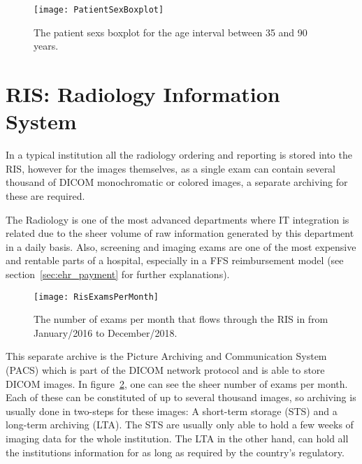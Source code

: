 \begin{center}
\begin{figure}
\begin{centering}
\texttt{[image: PatientSexBoxplot]}
\end{centering}
\caption{\label{fig:patient_sex_boxplot}The patient sexs boxplot for the age interval between 35 and 90 years.}
\end{figure}
\vspace*{-44pt}
\end{center}

\section{RIS: Radiology Information System}

In a typical institution all the radiology ordering and reporting is stored into the RIS, however for the images themselves, as a single exam can contain several thousand of DICOM monochromatic or colored images, a separate archiving for these are required. 

The Radiology is one of the most advanced departments where IT integration is related due to the sheer volume of raw information generated by this department in a daily basis. Also, screening and imaging exams are one of the most expensive and rentable parts of a hospital, especially in a FFS reimbursement model (see section~\ref{sec:ehr_payment} for further explanations).

\begin{center}
\begin{figure}
\begin{centering}
\texttt{[image: RisExamsPerMonth]}
\end{centering}
\caption{\label{fig:ris_exams_per_month} The number of exams per month that flows through the RIS in \nomeHslShort{} from January/2016 to December/2018.}
\end{figure}
\vspace*{-44pt}
\end{center}

This separate archive is the Picture Archiving and Communication System (PACS) which is part of the DICOM network protocol and is able to store DICOM images\cite{clunie2000, mildenberger2002}. In figure~\ref{fig:ris_exams_per_month}, one can see the sheer number of exams per month. Each of these can be constituted of up to several thousand images, so archiving is usually done in two-steps for these images: A short-term storage (STS) and a long-term archiving (LTA). The STS are usually only able to hold a few weeks of imaging data for the whole institution. The LTA in the other hand, can hold all the institutions information for as long as required by the country's regulatory.

